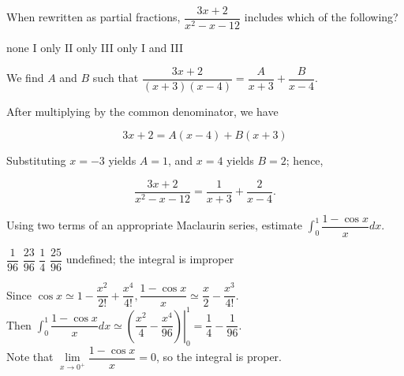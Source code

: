 \newpage





\question
When rewritten as partial fractions, $\dfrac{3 x+2}{x^{2}-x-12}$ includes which of the following?

\begin{choices}
  \choice none
  \choice I only
  \choice II only
  \choice III only
  \CorrectChoice I and III
\end{choices}
\begin{solution}
We find $A$ and $B$ such that $\dfrac{3 x+2}{(x+3)(x-4)}=\dfrac{A}{x+3}+\dfrac{B}{x-4}$.


After multiplying by the common denominator, we have

\[
3 x+2=A(x-4)+B(x+3)
\]

Substituting $x=-3$ yields $A=1$, and $x=4$ yields $B=2$; hence,

\[
\dfrac{3 x+2}{x^{2}-x-12}=\dfrac{1}{x+3}+\dfrac{2}{x-4} .
\]


\end{solution}

\question
Using two terms of an appropriate Maclaurin series, estimate $\displaystyle\int_{0}^{1} \dfrac{1-\cos x}{x} d x$.
\begin{choices}
  \choice $\dfrac{1}{96}$
  \CorrectChoice $\dfrac{23}{96}$
  \choice $\dfrac{1}{4}$
  \choice $\dfrac{25}{96}$
  \choice undefined; the integral is improper
\end{choices}
\begin{solution}
Since $\cos x \simeq 1-\dfrac{x^{2}}{2!}+\dfrac{x^{4}}{4!}, \dfrac{1-\cos x}{x} \simeq \dfrac{x}{2}-\dfrac{x^{3}}{4!}$.\\
Then $\left.\displaystyle\int_{0}^{1} \dfrac{1-\cos x}{x} d x \simeq\left(\dfrac{x^{2}}{4}-\dfrac{x^{4}}{96}\right)\right|_{0} ^{1}=\dfrac{1}{4}-\dfrac{1}{96}$.\\
Note that $\lim\limits_{x \to 0^{+}} \dfrac{1-\cos x}{x}=0$, so the integral is proper.
\end{solution}





\newpage





